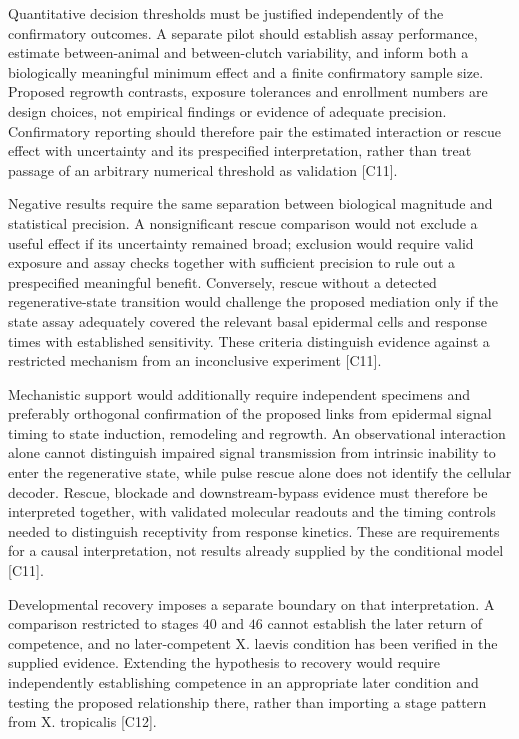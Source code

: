 \documentclass[11pt]{article}
\begin{document}
Quantitative decision thresholds must be justified independently of the confirmatory outcomes. A separate pilot should establish assay performance, estimate between-animal and between-clutch variability, and inform both a biologically meaningful minimum effect and a finite confirmatory sample size. Proposed regrowth contrasts, exposure tolerances and enrollment numbers are design choices, not empirical findings or evidence of adequate precision. Confirmatory reporting should therefore pair the estimated interaction or rescue effect with uncertainty and its prespecified interpretation, rather than treat passage of an arbitrary numerical threshold as validation [C11].

Negative results require the same separation between biological magnitude and statistical precision. A nonsignificant rescue comparison would not exclude a useful effect if its uncertainty remained broad; exclusion would require valid exposure and assay checks together with sufficient precision to rule out a prespecified meaningful benefit. Conversely, rescue without a detected regenerative-state transition would challenge the proposed mediation only if the state assay adequately covered the relevant basal epidermal cells and response times with established sensitivity. These criteria distinguish evidence against a restricted mechanism from an inconclusive experiment [C11].

Mechanistic support would additionally require independent specimens and preferably orthogonal confirmation of the proposed links from epidermal signal timing to state induction, remodeling and regrowth. An observational interaction alone cannot distinguish impaired signal transmission from intrinsic inability to enter the regenerative state, while pulse rescue alone does not identify the cellular decoder. Rescue, blockade and downstream-bypass evidence must therefore be interpreted together, with validated molecular readouts and the timing controls needed to distinguish receptivity from response kinetics. These are requirements for a causal interpretation, not results already supplied by the conditional model [C11].

Developmental recovery imposes a separate boundary on that interpretation. A comparison restricted to stages $40$ and $46$ cannot establish the later return of competence, and no later-competent X. laevis condition has been verified in the supplied evidence. Extending the hypothesis to recovery would require independently establishing competence in an appropriate later condition and testing the proposed relationship there, rather than importing a stage pattern from X. tropicalis [C12].
\end{document}
